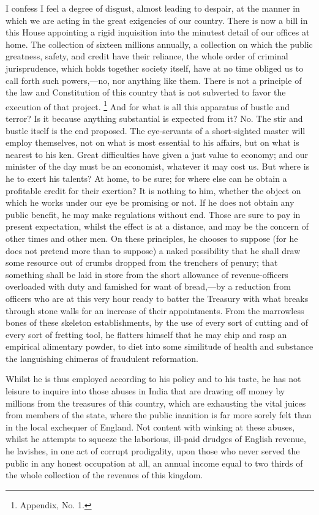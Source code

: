 I confess I feel a degree of disgust, almost leading to despair, at the manner in which we are acting in the great exigencies of our country. There is now a bill in this House appointing a rigid inquisition into the minutest detail of our offices at home. The collection of sixteen millions annually, a collection on which the public greatness, safety, and credit have their reliance, the whole order of criminal jurisprudence, which holds together society itself, have at no time obliged us to call forth such powers,—no, nor anything like them. There is not a principle of the law and Constitution of this country that is not subverted to favor the execution of that project.
\footnote{ Appendix, No. 1.}
 And for what is all this apparatus of bustle and terror? Is it because anything substantial is expected from it? No. The stir and bustle itself is the end proposed. The eye-servants of a short-sighted master will employ themselves, not on what is most essential to his affairs, but on what is nearest to his ken. Great difficulties have given a just value to economy; and our minister of the day must be an economist, whatever it may cost us. But where is he to exert his talents? At home, to be sure; for where else can he obtain a profitable credit for their exertion? It is nothing to him, whether the object on which he works under our eye be promising or not. If he does not obtain any public benefit, he may make regulations without end. Those are sure to pay in present expectation, whilst the effect is at a distance, and may be the concern of other times and other men. On these principles, he chooses to suppose (for he does not pretend more than to suppose) a naked possibility that he shall draw some resource out of crumbs dropped from the trenchers of penury; that something shall be laid in store from the short allowance of revenue-officers overloaded with duty and famished for want of bread,—by a reduction from officers who are at this very hour ready to batter the Treasury with what breaks through stone walls for an increase of their appointments. From the marrowless bones of these skeleton establishments, by the use of every sort of cutting and of every sort of fretting tool, he flatters himself that he may chip and rasp an empirical alimentary powder, to diet into some similitude of health and substance the languishing chimeras of fraudulent reformation.

Whilst he is thus employed according to his policy and to his taste, he has not leisure to inquire into those abuses in India that are drawing off money by millions from the treasures of this country, which are exhausting the vital juices from members of the state, where the public inanition is far more sorely felt than in the local exchequer of England. Not content with winking at these abuses, whilst he attempts to squeeze the laborious, ill-paid drudges of English revenue, he lavishes, in one act of corrupt prodigality, upon those who never served the public in any honest occupation at all, an annual income equal to two thirds of the whole collection of the revenues of this kingdom.

